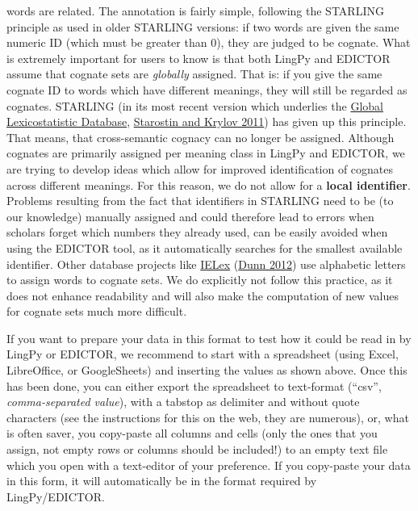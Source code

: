 \documentclass[a4paper,svgnames]{scrartcl}
\begin{document}
\begin{enumerate}
  words are related. The annotation is fairly simple, following the
  STARLING principle as used in older STARLING versions: if two words
  are given the same numeric ID (which must be greater than 0), they are
  judged to be cognate. What is extremely important for users to know is
  that both LingPy and EDICTOR assume that cognate sets are
  \emph{globally} assigned. That is: if you give the same cognate ID to
  words which have different meanings, they will still be regarded as
  cognates. STARLING (in its most recent version which underlies the
  \href{http://starling.rinet.ru/new100/main.htm}{Global Lexicostatistic
  Database},
  \href{http://bibliography.lingpy.org?key=Starostin2011}{Starostin and
  Krylov 2011}) has given up this principle. That means, that
  cross-semantic cognacy can no longer be assigned. Although cognates
  are primarily assigned per meaning class in LingPy and EDICTOR, we are
  trying to develop ideas which allow for improved identification of
  cognates across different meanings. For this reason, we do not allow
  for a \textbf{local identifier}. Problems resulting from the fact that
  identifiers in STARLING need to be (to our knowledge) manually
  assigned and could therefore lead to errors when scholars forget which
  numbers they already used, can be easily avoided when using the
  EDICTOR tool, as it automatically searches for the smallest available
  identifier. Other database projects like
  \href{http://ielex.mpi.nl/}{IELex}
  (\href{http://bibliography.lingpy.org?key=Dunn2012}{Dunn 2012}) use
  alphabetic letters to assign words to cognate sets. We do explicitly
  not follow this practice, as it does not enhance readability and will
  also make the computation of new values for cognate sets much more
  difficult.
\end{enumerate}

If you want to prepare your data in this format to test how it could be
read in by LingPy or EDICTOR, we recommend to start with a spreadsheet
(using Excel, LibreOffice, or GoogleSheets) and inserting the values as
shown above. Once this has been done, you can either export the
spreadsheet to text-format (``csv'', \emph{comma-separated value}), with
a tabstop as delimiter and without quote characters (see the
instructions for this on the web, they are numerous), or, what is often
saver, you copy-paste all columns and cells (only the ones that you
assign, not empty rows or columns should be included!) to an empty text
file which you open with a text-editor of your preference. If you
copy-paste your data in this form, it will automatically be in the
format required by LingPy/EDICTOR.
\end{document}
